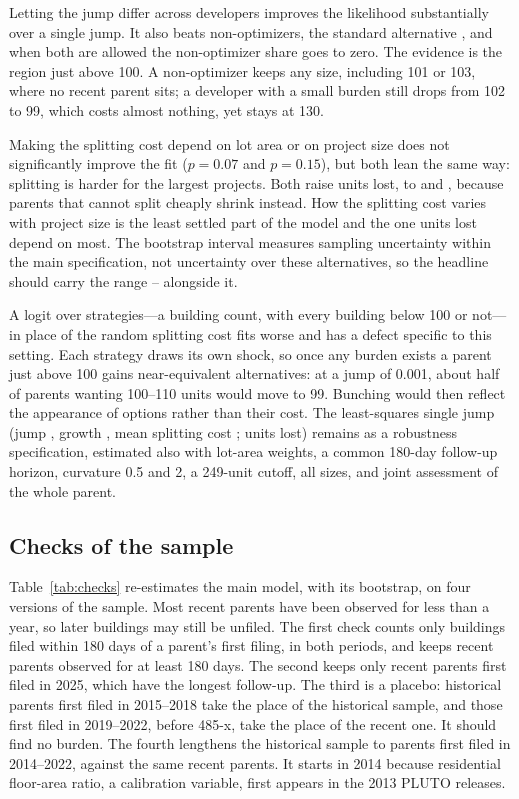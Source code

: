 \documentclass[11pt]{article}
\begin{document}
Letting the jump differ across developers improves the likelihood substantially over a single jump. It also beats non-optimizers, the standard alternative \citep{klevenwaseem2013}, and when both are allowed the non-optimizer share goes to zero. The evidence is the region just above 100. A non-optimizer keeps any size, including 101 or 103, where no recent parent sits; a developer with a small burden still drops from 102 to 99, which costs almost nothing, yet stays at 130.

Making the splitting cost depend on lot area or on project size does not significantly improve the fit ($p=0.07$ and $p=0.15$), but both lean the same way: splitting is harder for the largest projects. Both raise units lost, to \SizeSplittingUnitsLost{} and \LotSplittingUnitsLost{}, because parents that cannot split cheaply shrink instead. How the splitting cost varies with project size is the least settled part of the model and the one units lost depend on most. The bootstrap interval measures sampling uncertainty within the main specification, not uncertainty over these alternatives, so the headline should carry the range \MainUnitsLost--\LotSplittingUnitsLost{} alongside it.

A logit over strategies---a building count, with every building below 100 or not---in place of the random splitting cost fits worse and has a defect specific to this setting. Each strategy draws its own shock, so once any burden exists a parent just above 100 gains near-equivalent alternatives: at a jump of 0.001, about half of parents wanting 100--110 units would move to 99. Bunching would then reflect the appearance of options rather than their cost. The least-squares single jump (jump \LeastSquaresKappa{}, growth \LeastSquaresGamma{}, mean splitting cost \LeastSquaresSigma{}; \LeastSquaresUnitsLost{} units lost) remains as a robustness specification, estimated also with lot-area weights, a common 180-day follow-up horizon, curvature 0.5 and 2, a 249-unit cutoff, all sizes, and joint assessment of the whole parent.

\subsection{Checks of the sample}
\label{sec:checks}

Table~\ref{tab:checks} re-estimates the main model, with its bootstrap, on four versions of the sample. Most recent parents have been observed for less than a year, so later buildings may still be unfiled. The first check counts only buildings filed within 180 days of a parent's first filing, in both periods, and keeps recent parents observed for at least 180 days. The second keeps only recent parents first filed in 2025, which have the longest follow-up. The third is a placebo: historical parents first filed in 2015--2018 take the place of the historical sample, and those first filed in 2019--2022, before 485-x, take the place of the recent one. It should find no burden. The fourth lengthens the historical sample to parents first filed in 2014--2022, against the same recent parents. It starts in 2014 because residential floor-area ratio, a calibration variable, first appears in the 2013 PLUTO releases.
\end{document}
